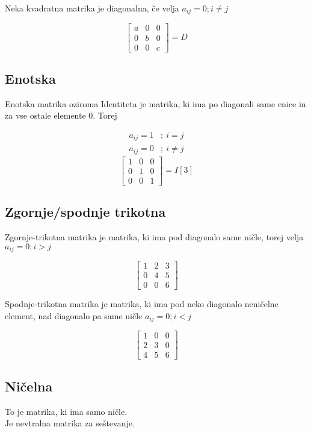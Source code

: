 \documentclass[12pt]{report}
\begin{document}
Neka kvadratna matrika je diagonalna, če velja $a_{ij} = 0 ; i\neq	j$

\[
\begin{bmatrix}a &0  &0 \\ 0 &b  &0 \\ 0 &0  &c \end{bmatrix}= D
\]


\subsection*{Enotska}

Enotska matrika oziroma Identiteta je matrika, ki ima po diagonali same enice in za vse ostale elemente 0. Torej


\[
\begin{matrix}a_{ij} = 1 & ;\ i = j \\ a_{ij} = 0 &;\ i\neq j \end{matrix} 
\]
\[
\begin{bmatrix}1 &0  &0 \\ 0 &1  &0 \\ 0 &0  &1 \end{bmatrix}=I[3]
\]

\pagebreak
\subsection*{Zgornje/spodnje trikotna}

Zgornje-trikotna matrika je matrika, ki ima pod diagonalo same ničle, torej velja $a_{ij} = 0; i>j$

\[
\begin{bmatrix}1 &2  &3 \\ 0 &4  &5 \\ 0 &0  &6 \end{bmatrix}
\]

Spodnje-trikotna matrika je matrika, ki ima pod neko diagonalo neničelne element, nad diagonalo pa same ničle $a_{ij} = 0 ; i < j$


\[
\begin{bmatrix}1 &0  &0 \\ 2 &3  &0 \\ 4 &5  &6 \end{bmatrix}
\]

\subsection*{Ničelna}
To je matrika, ki ima samo ničle. \\
Je nevtralna matrika za seštevanje.
\end{document}
